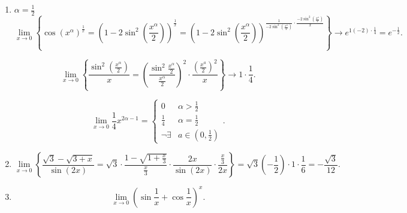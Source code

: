 \begin{enumerate}
\item
    $\alpha = \frac{1}{2}$
    \begin{equation*}
        \lim_{x \to 0} \left\{ 
            \cos(x^{\alpha})^{\frac{1}{x}}
            = \left(1 - 2\sin^2\left(\frac{x^{\alpha}}{2}\right)\right)^{\frac{1}{x}}
            = \left(1 - 2\sin^2\left(\frac{x^{\alpha}}{2}\right)\right)^{\frac{1}{-2\sin^2\left(\frac{x^{\alpha}}{2}\right)} \cdot \frac{-2\sin^2\left(\frac{x^{\alpha}}{2}\right)}{x}}
        \right\}
        \to e^{1 (-2) \cdot \frac{1}{4}} = e^{-\frac{1}{2}}
    .\end{equation*}

    \begin{equation*}
        \lim_{x \to 0} \left\{
            \frac{\sin^2\left(\frac{x^{\alpha}}{2}\right)}{x} = \left(\frac{\sin^2 \frac{x^{\alpha}}{2}}{\frac{x^{\alpha}}{2}}\right)^2 \cdot \frac{\left(\frac{x^{a}}{2}\right)^2}{x}
        \right\} \to 1 \cdot \frac{1}{4}
    .\end{equation*}

    \begin{equation*}
        \lim_{x \to 0} \frac{1}{4} x^{2\alpha - 1} = \begin{cases}
            0 & \alpha > \frac{1}{2} \\
            \frac{1}{4} & \alpha = \frac{1}{2} \\
            \neg \exists & a \in (0, \frac{1}{2})
        \end{cases}
    .\end{equation*}

\item
    \begin{equation*}
        \lim_{x \to 0} \left\{
            \frac{\sqrt{3} - \sqrt{3 + x}}{\sin(2x)} = \sqrt{3} \cdot \frac{1 - \sqrt{1 + \frac{x}{3}}}{\frac{x}{3}} \cdot \frac{2x}{\sin (2x)} \cdot \frac{\frac{x}{3}}{2x}
        \right\}
        = \sqrt{3} (-\frac{1}{2}) \cdot 1 \cdot \frac{1}{6} = -\frac{\sqrt{3}}{12}
    .\end{equation*}

\item
    \begin{equation*}
        \lim_{x \to 0} \left(\sin \frac{1}{x} + \cos \frac{1}{x}\right)^x
    .\end{equation*}
\end{enumerate}
